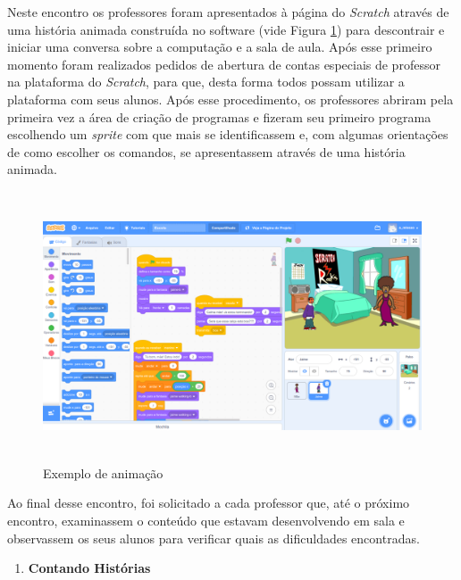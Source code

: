 \documentclass[12pt, openright, a4paper, brazil, english, french, spanish, bibjustif, openany, oneside]{abntex2}
\begin{document}
Neste encontro os professores foram apresentados à página do \textit{Scratch} através de uma história animada construída no software (vide Figura \ref{exemploani4}) para descontrair e iniciar uma conversa sobre a computação e a sala de aula. Após esse primeiro momento foram realizados pedidos de abertura de contas especiais de professor na plataforma do \textit{Scratch}, para que, desta forma todos possam utilizar a plataforma com seus alunos. Após esse procedimento, os professores abriram pela primeira vez a área de criação de programas e fizeram seu primeiro programa escolhendo um \textit{sprite} com que mais se identificassem e, com algumas orientações de como escolher os comandos, se apresentassem através de uma história animada.



\begin{figure}[H]

    \center
    \caption{Exemplo de animação \label{exemploani4}}
    \includegraphics[height=8cm]{exemploani.png}
    
\end{figure}
 
Ao final desse encontro, foi solicitado a cada professor que, até o próximo encontro, examinassem o conteúdo que estavam desenvolvendo em sala e observassem os seus alunos para verificar quais as dificuldades encontradas.

\begin{enumerate}[resume,label=\textbf{\arabic*.}]

\item \textbf{Contando Histórias}

\end{enumerate}
\end{document}
